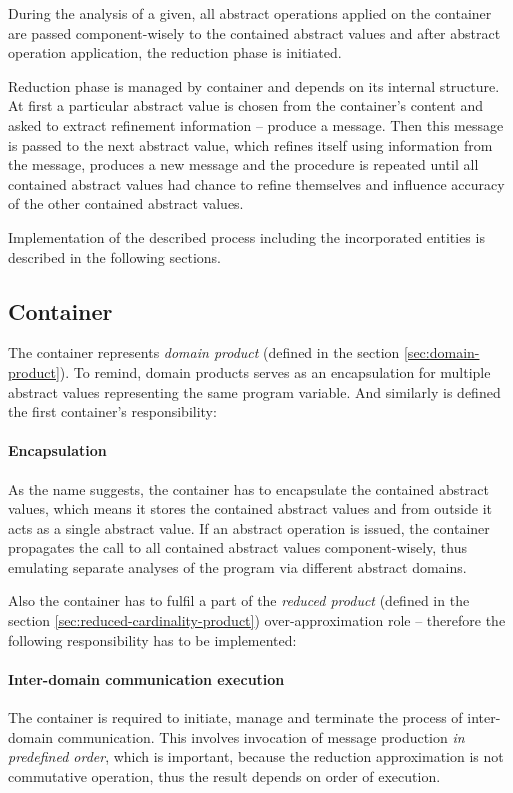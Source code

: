 \documentclass[12pt,oneside]{fithesis2}
\theoremstyle{definition}
\begin{document}
During the analysis of a given, all abstract operations applied on the container are passed component-wisely to the contained abstract values and after abstract operation application, the reduction phase is initiated.

Reduction phase is managed by container and depends on its internal structure. At first a particular abstract value is chosen from the container's content and asked to extract refinement information -- produce a message. Then this message is passed to the next abstract value, which refines itself using information from the message, produces a new message and the procedure is repeated until all contained abstract values had chance to refine themselves and influence accuracy of the other contained abstract values.

Implementation of the described process including the incorporated entities is described in the following sections.

\subsection{Container}

The container represents \textit{domain product} (defined in the section \ref{sec:domain-product}). To remind, domain products serves as an encapsulation for multiple abstract values representing the same program variable. And similarly is defined the first container's responsibility:

\paragraph{Encapsulation}
As the name suggests, the container has to encapsulate the contained abstract values, which means it stores the contained abstract values and from outside it acts as a single abstract value. If an abstract operation is issued, the container propagates the call to all contained abstract values component-wisely, thus emulating separate analyses of the program via different abstract domains.

\vspace{1\baselineskip} %

Also the container has to fulfil a part of the \textit{reduced product} (defined in the section \ref{sec:reduced-cardinality-product}) over-approximation role -- therefore the following responsibility has to be implemented:

\paragraph{Inter-domain communication execution}
The container is required to initiate, manage and terminate the process of inter-domain communication. This involves invocation of message production \textit{in predefined order}, which is important, because the reduction approximation is not commutative operation, thus the result depends on order of execution.
\end{document}
